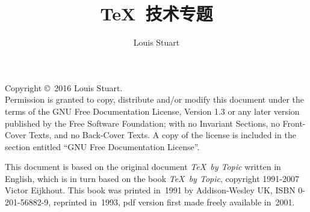 \documentclass[twoside,letterpaper,no-math]{rapport3}
\title{\TeX\ 技术专题}
\author{Louis Stuart}
\date{}
\begin{document}
\maketitle

Copyright \copyright\ 2016 Louis Stuart.\\
Permission is granted to copy, distribute and/or modify this document
under the terms of the GNU Free Documentation License, Version 1.3
or any later version published by the Free Software Foundation;
with no Invariant Sections, no Front-Cover Texts, and no Back-Cover
Texts.  A copy of the license is included in the section entitled ``GNU
Free Documentation License''.
\par\medskip
This document is based on the original document {\itshape \TeX\ by Topic} written in English, 
which is in turn based on the book {\itshape \TeX\ by Topic},
copyright 1991-2007 Victor Eijkhout. This book was
printed in~1991 by Addison-Wesley UK, ISBN 0-201-56882-9, reprinted
in~1993, pdf version first made freely available in~2001.

\tableofcontents



\end{document}
